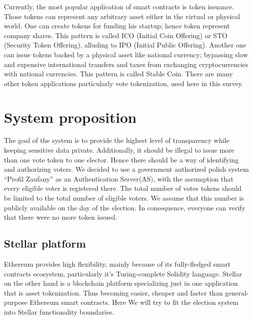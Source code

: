 \documentclass[runningheads]{llncs}
\begin{document}
Currently, the most popular application of smart contracts is token issuance. Those tokens can represent any arbitrary asset either in the virtual or physical world. One can create tokens for funding his startup; hence token represent company shares. This pattern is called ICO (Initial Coin Offering) or STO (Security Token Offering), alluding to IPO (Initial Public Offering). Another one can issue tokens backed by a physical asset like national currency; bypassing slow and expensive international transfers and taxes from exchanging cryptocurrencies with national currencies. This pattern is called Stable Coin. There are many other token applications particularly vote tokenization, used here in this survey.


\section{System proposition}
The goal of the system is to provide the highest level of transparency while keeping sensitive data private. Additionally, it should be illegal to issue more than one vote token to one elector. Hence there should be a way of identifying and authorizing voters. We decided to use a government authorized polish system
“Profil Zaufany” as an Authentication Server(AS), with the assumption that every eligible voter is registered there. The total number of votes tokens should be limited to the total number of eligible voters. We assume that this number is publicly available on the day of the election. In consequence, everyone can verify that there were no more token issued. 

\subsection{Stellar platform}
Ethereum provides high flexibility, mainly because of its fully-fledged smart contracts ecosystem, particularly it’s Turing-complete Solidity language. Stellar on the other hand is a blockchain platform specializing just in one application that is asset tokenization. Thus becoming easier, cheaper and faster than general-purpose Ethereum smart contracts. Here We will try to fit the election system into Stellar functionality boundaries.
\end{document}
